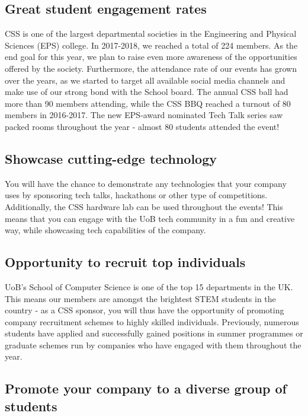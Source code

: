 \documentclass{article}
\begin{document}
\subsection*{Great student engagement rates}

CSS is one of the largest departmental societies in the Engineering and Physical Sciences (EPS) college. In 2017-2018, we reached a total of 224 members. As the end goal for this year, we plan to raise even more awareness of the opportunities offered by the society.
Furthermore, the attendance rate of our events has grown over the years, as we started to target all available social media channels and make use of our strong bond with the School board. 
The annual CSS ball had more than 90 members attending, while the CSS BBQ reached a turnout of 80 members in 2016-2017.  The new EPS-award nominated Tech Talk series saw packed rooms throughout the year - almost 80 students attended the event!

\subsection*{Showcase cutting-edge technology}

You will have the chance to demonstrate any technologies that your company uses by sponsoring tech talks, hackathons or other type of competitions. Additionally, the CSS hardware lab can be used throughout the events! 
This means that you can engage with the UoB tech community in a fun and creative way, while showcasing tech capabilities of the company.

\subsection*{Opportunity to recruit top individuals}

UoB’s School of Computer Science is one of the top 15 departments in the UK. 
This means our members are amongst the brightest STEM students in the country - as a CSS sponsor, you will thus have the opportunity of promoting company recruitment schemes to highly skilled individuals.
Previously, numerous students have applied and successfully gained positions in summer programmes or graduate schemes run by companies who have engaged with them throughout the year. 

\subsection*{Promote your company to a diverse group of students}
\end{document}
